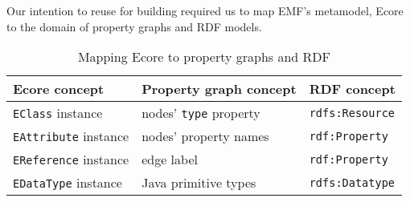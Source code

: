 Our intention to reuse \eiq{} for building \iqd{} required us to map EMF's metamodel, Ecore to the domain of property graphs and RDF models.

\begin{table}[htb]

\centering
\begin{tabular}{ | l | l | l | }

\hline
\bf Ecore concept          & \bf Property graph concept  & \bf RDF concept \tabularnewline \hline\hline
\verb+EClass+ instance     & nodes' \verb+type+ property & \verb+rdfs:Resource+ \\ \hline
\verb+EAttribute+ instance & nodes' property names       & \verb+rdf:Property+  \\ \hline
\verb+EReference+ instance & edge label                  & \verb+rdf:Property+  \\ \hline
\verb+EDataType+ instance  & Java primitive types        & \verb+rdfs:Datatype+ \\ \hline
 
\end{tabular}
\caption{Mapping Ecore to property graphs and RDF}
\label{tab:ecore-mapping}

\end{table}


